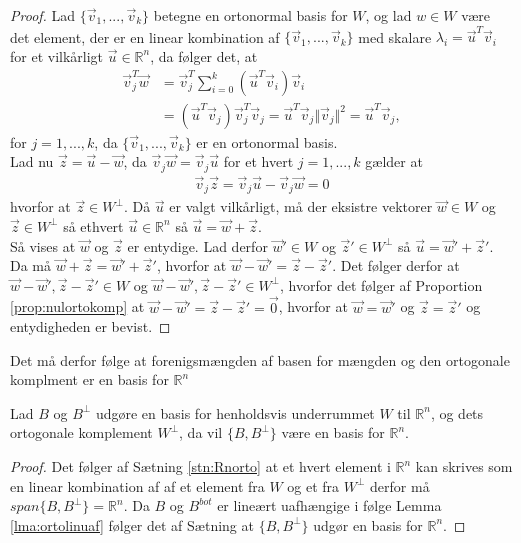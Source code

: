 \begin{proof}
Lad $\{\vec{v}_1,...,\vec{v}_k\}$ betegne en ortonormal basis for $W$, og lad $w \in W$ være det element, der er en linear kombination af $\{\vec{v}_1,...,\vec{v}_k\}$ med skalare $\lambda_i = \vec{u}^T\vec{v}_i$ for et vilkårligt $\vec{u} \in \mathds{R}^n$, da følger det, at
\begin{align*}
\vec{v}_j^T\vec{w} &= \vec{v}_j^T\sum_{i=0}^k(\vec{u}^T\vec{v}_i)\vec{v}_i
\\ & = (\vec{u}^T\vec{v}_j)\vec{v}_j^T\vec{v}_j = \vec{u}^T\vec{v}_j \Vert \vec{v}_j \Vert^2 = \vec{u}^T\vec{v}_j,
\end{align*}
for $j=1,...,k$, da $\{\vec{v}_1,...,\vec{v}_k\}$ er en ortonormal basis.
\\ Lad nu $\vec{z} = \vec{u}- \vec{w}$, da $\vec{v}_j\vec{w}= \vec{v}_j\vec{u}$ for et hvert $j=1,...,k$ gælder at 
\begin{align*}
\vec{v}_j\vec{z} = \vec{v}_j\vec{u}- \vec{v}_j\vec{w} = 0
\end{align*}
hvorfor at $\vec{z} \in W^{\bot}$. 
Då $\vec{u}$ er valgt vilkårligt, må der eksistre vektorer $\vec{w} \in W$ og $\vec{z} \in W^{\bot}$ så ethvert $\vec{u} \in \mathds{R}^n$ så $\vec{u}= \vec{w}+\vec{z}$.
\\Så vises at $\vec{w}$ og $\vec{z}$ er entydige.
Lad derfor $\vec{w}' \in W$ og $\vec{z}' \in W^{\bot}$ så $\vec{u}= \vec{w}' + \vec{z}'$.
Da må $\vec{w} + \vec{z} = \vec{w}' + \vec{z}'$, hvorfor at $\vec{w}-\vec{w}' = \vec{z}-\vec{z}'$.
Det følger derfor at $\vec{w}-\vec{w}', \vec{z}-\vec{z}' \in W$ og $\vec{w}-\vec{w}', \vec{z}-\vec{z}' \in W^{\bot}$, hvorfor det følger af Proportion \ref{prop:nulortokomp} at $\vec{w}-\vec{w}' = \vec{z}-\vec{z}' = \vec{0}$, hvorfor at $\vec{w}= \vec{w}'$ og $\vec{z}=\vec{z}'$ og entydigheden er bevist.
\end{proof}
Det må derfor følge at forenigsmængden af basen for mængden og den ortogonale komplment er en basis for $\mathds{R}^n$
\begin{kor}
Lad $B$  og $B^{\bot}$ udgøre en basis for henholdsvis underrummet $W$ til $\mathds{R}^n$, og dets ortogonale komplement $W^{\bot}$, da vil $\{B, B^{\bot}\}$ være en basis for $\mathds{R}^n$.
\label{kor:basisRnorto}
\end{kor}
\begin{proof}
Det følger af Sætning \ref{stn:Rnorto} at et hvert element i $\mathds{R}^n$ kan skrives som en linear kombination af af et element fra $W$ og et fra $W^{\bot}$ derfor må $span\{B, B^{\bot}\} = \mathds{R}^n$. 
Da $B$ og $B^{bot}$ er lineært uafhængige i følge Lemma \ref{lma:ortolinuaf} følger det af Sætning 
at $\{B, B^{\bot}\}$ udgør en basis for $\mathds{R}^n$.
\end{proof}
